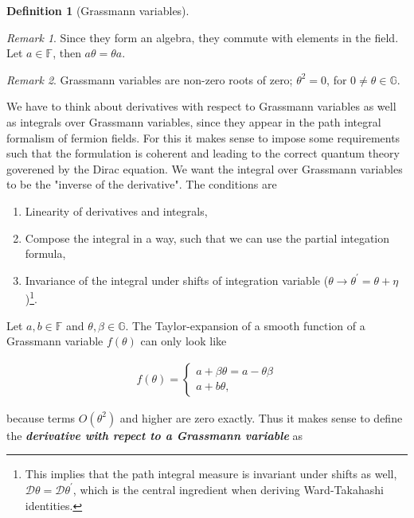 \documentclass{article}
\theoremstyle{plain} %
\newtheorem{definition}{Definition}[section]
\theoremstyle{convention} %
\theoremstyle{remark} %
\newtheorem*{remark}{Remark} %
\def\df#1{\textbf{\textit{#1}}}
\numberwithin{equation}{section}
\begin{document}
\begin{appendix}
\begin{definition}[Grassmann variables]
\end{definition}

\begin{remark}
  Since they form an algebra, they commute with elements in the field. Let $a \in \mathbb{F}$, then $a \theta = \theta a$.
\end{remark}
\begin{remark}
  Grassmann variables are non-zero roots of zero; $\theta^2 = 0$, for $0 \ne \theta \in \mathbb{G}$.
\end{remark}

We have to think about derivatives with respect to Grassmann variables as well as integrals over Grassmann variables, since they appear in the path integral formalism of fermion fields. For this it makes sense to impose some requirements such that the formulation is coherent and leading to the correct quantum theory goverened by the Dirac equation. We want the integral over Grassmann variables to be the "inverse of the derivative". The conditions are

\begin{enumerate}
  \item Linearity of derivatives and integrals,
  \item Compose the integral in a way, such that we can use the partial integation formula,
  \item Invariance of the integral under shifts of integration variable ($\theta \rightarrow \theta^{\prime} = \theta + \eta$)\footnote{This implies that the path integral measure is invariant under shifts as well, $\mathcal{D} \theta = \mathcal{D} \theta^{\prime}$, which is the central ingredient when deriving Ward-Takahashi identities.}.
\end{enumerate}

Let $a,b \in \mathbb{F}$ and $\theta, \beta \in \mathbb{G}$. The Taylor-expansion of a smooth function of a Grassmann variable $f(\theta)$ can only look like

\begin{align*}
  f(\theta) = \left\{
      \begin{array}{ll}
          a + \beta \theta = a - \theta \beta \\
          a + b \theta,
      \end{array}
  \right.
\end{align*}

because terms $O(\theta^2)$ and higher are zero exactly. Thus it makes sense to define the \df{derivative with repect to a Grassmann variable} as


\end{appendix}
\end{document}
